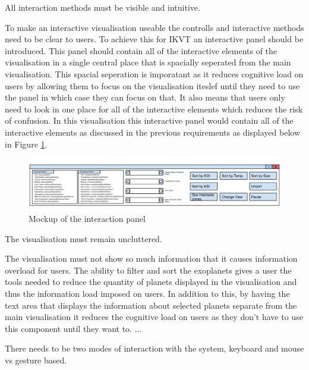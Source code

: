 \begin{enumerate}


{\bf \item[R6.] All interaction methods must be visible and intuitive.}

To make an interactive visualisation useable the controlls and interactive
methods need to be clear to users. To achieve this for IKVT an interactive panel
should be introduced. This panel should contain all of the interactive elements
of the visualisation in a single central place that is spacially seperated from
the main visualisation. This spacial seperation is imporatant as it reduces
cognitive load on users by allowing them to focus on the visualisation iteslef
until they need to use the panel in which case they can focus on that. It also
means that users only need to look in one place for all of the interactive
elements which reduces the risk of confusion. In this visualisation this
interactive panel would contain all of the interactive elements as discussed in
the previous requirements as displayed below in Figure
\ref{fig:interactionPanelMock}.

\begin{figure}[H]
  \centering
      \includegraphics[width=1\textwidth]{images/allTogether.png}
  \caption{Mockup of the interaction panel}  
  \label{fig:interactionPanelMock}
\end{figure}


{\bf \item[R7.] The visualisation must remain uncluttered.}

The visualisation must not show so much information that it
causes information overload for users. The ability to filter and sort the
exoplanets gives a user the tools needed to
reduce the quantity of planets displayed in the visualisation and thus the
information load imposed on users. In addition to this, by having the text area
that displays the information about
selected planets separate from the main visualisation it reduces the cognitive
load on users as they don't have to use this component until they want to. ...~


{\bf  \item[R8.] There needs to be two modes of interaction with the system,
keyboard and mouse vs gesture based.}


\end{enumerate}
